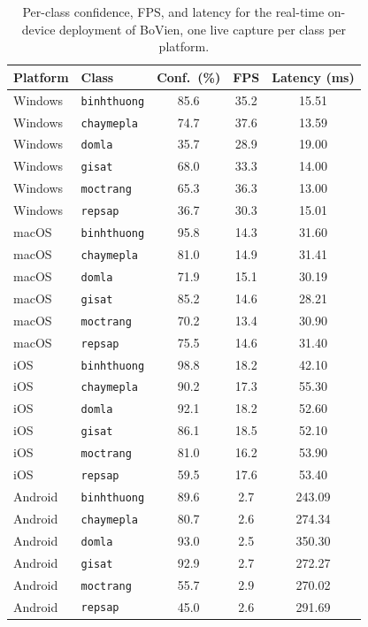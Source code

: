 \begin{table}[htbp]
\centering
\caption{Per-class confidence, FPS, and latency for the real-time on-device deployment of BoVien, one live capture per class per platform.}
\label{tab:realtime_demo_per_class}
\small
\setlength{\tabcolsep}{3pt}
\begin{tabular}{llccc}
\toprule
\textbf{Platform} & \textbf{Class} & \textbf{Conf.\ (\%)} & \textbf{FPS} & \textbf{Latency (ms)} \\
\midrule
Windows & \texttt{binhthuong} & 85.6 & 35.2 & 15.51 \\
Windows & \texttt{chaymepla}  & 74.7 & 37.6 & 13.59 \\
Windows & \texttt{domla}      & 35.7 & 28.9 & 19.00 \\
Windows & \texttt{gisat}      & 68.0 & 33.3 & 14.00 \\
Windows & \texttt{moctrang}   & 65.3 & 36.3 & 13.00 \\
Windows & \texttt{repsap}     & 36.7 & 30.3 & 15.01 \\
\midrule
macOS   & \texttt{binhthuong} & 95.8 & 14.3 & 31.60 \\
macOS   & \texttt{chaymepla}  & 81.0 & 14.9 & 31.41 \\
macOS   & \texttt{domla}      & 71.9 & 15.1 & 30.19 \\
macOS   & \texttt{gisat}      & 85.2 & 14.6 & 28.21 \\
macOS   & \texttt{moctrang}   & 70.2 & 13.4 & 30.90 \\
macOS   & \texttt{repsap}     & 75.5 & 14.6 & 31.40 \\
\midrule
iOS     & \texttt{binhthuong} & 98.8 & 18.2 & 42.10 \\
iOS     & \texttt{chaymepla}  & 90.2 & 17.3 & 55.30 \\
iOS     & \texttt{domla}      & 92.1 & 18.2 & 52.60 \\
iOS     & \texttt{gisat}      & 86.1 & 18.5 & 52.10 \\
iOS     & \texttt{moctrang}   & 81.0 & 16.2 & 53.90 \\
iOS     & \texttt{repsap}     & 59.5 & 17.6 & 53.40 \\
\midrule
Android & \texttt{binhthuong} & 89.6 & 2.7  & 243.09 \\
Android & \texttt{chaymepla}  & 80.7 & 2.6  & 274.34 \\
Android & \texttt{domla}      & 93.0 & 2.5  & 350.30 \\
Android & \texttt{gisat}      & 92.9 & 2.7  & 272.27 \\
Android & \texttt{moctrang}   & 55.7 & 2.9  & 270.02 \\
Android & \texttt{repsap}     & 45.0 & 2.6  & 291.69 \\
\bottomrule
\end{tabular}
\end{table}


